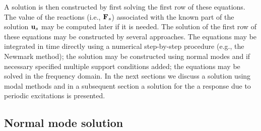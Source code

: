 A solution is then constructed by first solving the first row of these
equations. The value of the reactions (i.e., $\mathbf{F}_s$) associated
with the known part of the solution $\mathbf{u}_s$ may be computed later if it is
needed.  The solution of the first row of these equations may be
constructed by several approaches.  The equations may be integrated in
time directly using a numerical step-by-step procedure (e.g., the Newmark
method); the solution may be constructed using normal modes and if necessary
specified multiple support conditions added; the equations may be solved in
the frequency domain.  In the next sections we discuss a solution using
modal methods and in a subsequent section a solution for the a response
due to periodic excitations is presented.

\subsection{Normal mode solution}
\label{normal}

